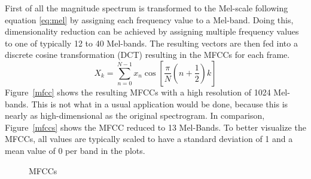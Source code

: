 \FloatBarrier
\noindent First of all the magnitude spectrum is transformed to the Mel-scale following equation \eqref{eq:mel} by assigning each frequency value to a Mel-band.
Doing this, dimensionality reduction can be achieved by assigning multiple frequency values to one of typically 12 to 40 Mel-bands. The resulting vectors are then fed into a discrete cosine transformation (DCT) resulting in the MFCCs for each frame. 
\begin{equation} \label{eq:dct}
X_k = \sum_{n=0}^{N-1}{x_n \cos\left[{\frac{\pi}{N}(n + \frac{1}{2})k}\right]}
\end{equation}
Figure~\ref{mfcc} shows the resulting MFCCs with a high resolution of 1024 Mel-bands. This is not what in a usual application would be done, because this is nearly as high-dimensional as the original spectrogram. In comparison, Figure~\ref{mfccs} shows the MFCC reduced to 13 Mel-Bands.
To better visualize the MFCCs, all values are typically scaled to have a standard deviation of 1 and a mean value of 0 per band in the plots. 
\begin{figure}[htbp]
	\centering
	\caption{MFCCs}	
	\label{fig:mfcc}
\end{figure}
